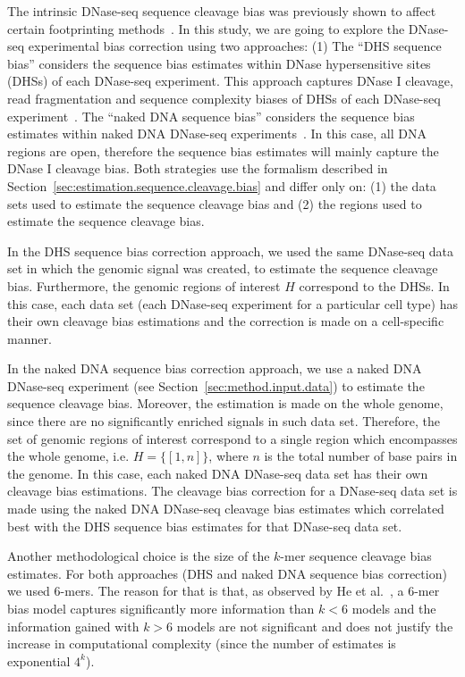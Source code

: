 The intrinsic DNase-seq sequence cleavage bias was previously shown to affect certain footprinting methods~\cite{he2014}. In this study, we are going to explore the DNase-seq experimental bias correction using two approaches: (1) The ``DHS sequence bias'' considers the sequence bias estimates within DNase hypersensitive sites (DHSs) of each DNase-seq experiment. This approach captures DNase I cleavage, read fragmentation and sequence complexity biases of DHSs of each DNase-seq experiment~\cite{he2014}. The ``naked DNA sequence bias'' considers the sequence bias estimates within naked DNA DNase-seq experiments~\cite{yardimci2014}. In this case, all DNA regions are open, therefore the sequence bias estimates will mainly capture the DNase I cleavage bias. Both strategies use the formalism described in Section~\ref{sec:estimation.sequence.cleavage.bias} and differ only on: (1) the data sets used to estimate the sequence cleavage bias and (2) the regions used to estimate the sequence cleavage bias.

In the DHS sequence bias correction approach, we used the same DNase-seq data set in which the genomic signal was created, to estimate the sequence cleavage bias. Furthermore, the genomic regions of interest $H$ correspond to the DHSs. In this case, each data set (each DNase-seq experiment for a particular cell type) has their own cleavage bias estimations and the correction is made on a cell-specific manner.

In the naked DNA sequence bias correction approach, we use a naked DNA DNase-seq experiment (see Section~\ref{sec:method.input.data}) to estimate the sequence cleavage bias. Moreover, the estimation is made on the whole genome, since there are no significantly enriched signals in such data set. Therefore, the set of genomic regions of interest correspond to a single region which encompasses the whole genome, i.e. $H = \{ [1,n] \}$, where $n$ is the total number of base pairs in the genome. In this case, each naked DNA DNase-seq data set has their own cleavage bias estimations. The cleavage bias correction for a DNase-seq data set is made using the naked DNA DNase-seq cleavage bias estimates which correlated best with the DHS sequence bias estimates for that DNase-seq data set.

Another methodological choice is the size of the $k$-mer sequence cleavage bias estimates. For both approaches (DHS and naked DNA sequence bias correction) we used $6$-mers. The reason for that is that, as observed by He et al.~\cite{he2014}, a $6$-mer bias model captures significantly more information than $k < 6$ models and the information gained with $k > 6$ models are not significant and does not justify the increase in computational complexity (since the number of estimates is exponential $4^k$).


